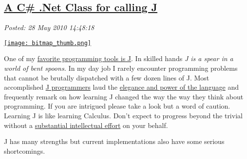 %

\subsection*{\href{http://bakerjd99.wordpress.com/2010/05/28/a-c-net-class-for-calling-j/}{A C\# .Net Class for calling J}}


\noindent\emph{Posted: 28 May 2010 14:48:18}
\vspace{6pt}

\captionsetup[floatingfigure]{labelformat=empty}
\begin{floatingfigure}[l]{0.12\textwidth}
\centering
\href{http://www.jsoftware.com/}{\texttt{[image: bitmap\_thumb.png]}}
\label{fig:537X0}
\end{floatingfigure}One of my \href{http://www.jsoftware.com/}{favorite programming tools is
J}. In skilled hands \emph{J is a spear in a world of bent spoons.} In my
day job I rarely encounter programming problems that cannot be brutally
dispatched with a few dozen lines of J. Most accomplished
\href{http://www.lulu.com/product/paperback/j-for-c-programmers/4669553}{J
programmers} laud the
\href{http://portal.acm.org/citation.cfm?id=508562}{elegance and power
of the language} and frequently remark on how learning J changed the way
the way they think about programming. If you are intrigued please take a
look but a word of caution. Learning J is like learning Calculus. Don't
expect to progress beyond the trivial without a
\href{http://norvig.com/21-days.html}{substantial intellectual effort}
on your behalf.

J has many strengths but current implementations also have some serious
shortcomings.

